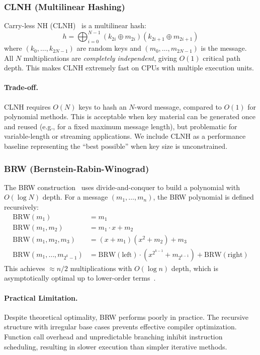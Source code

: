 \subsubsection{CLNH (Multilinear Hashing)}

Carry-less NH (CLNH)~\cite{lemire2015clhash} is a multilinear hash:
\[
h = \bigoplus_{i=0}^{N-1} (k_{2i} \oplus m_{2i})(k_{2i+1} \oplus m_{2i+1})
\]
where $(k_0, \ldots, k_{2N-1})$ are random keys and $(m_0, \ldots, m_{2N-1})$ is the message.
All $N$ multiplications are \emph{completely independent}, giving $O(1)$ critical path depth.
This makes CLNH extremely fast on CPUs with multiple execution units.

\paragraph{Trade-off.}
CLNH requires $O(N)$ keys to hash an $N$-word message, compared to $O(1)$ for polynomial methods.
This is acceptable when key material can be generated once and reused (e.g., for a fixed
maximum message length), but problematic for variable-length or streaming applications.
We include CLNH as a performance baseline representing the ``best possible'' when key size
is unconstrained.

\subsubsection{BRW (Bernstein-Rabin-Winograd)}

The BRW construction~\cite{rabin1972number} uses divide-and-conquer to build a polynomial
with $O(\log N)$ depth.
For a message $(m_1, \ldots, m_n)$, the BRW polynomial is defined recursively:
\begin{align}
\text{BRW}(m_1) &= m_1 \\
\text{BRW}(m_1, m_2) &= m_1 \cdot x + m_2 \\
\text{BRW}(m_1, m_2, m_3) &= (x + m_1)(x^2 + m_2) + m_3 \\
\text{BRW}(m_1, \ldots, m_{2^k-1}) &= \text{BRW}(\text{left}) \cdot (x^{2^{k-1}} + m_{2^{k-1}}) + \text{BRW}(\text{right})
\end{align}
This achieves $\approx n/2$ multiplications with $O(\log n)$ depth, which is asymptotically optimal up to lower-order terms~\cite{rabin1972number}.

\paragraph{Practical Limitation.}
Despite theoretical optimality, BRW performs poorly in practice.
The recursive structure with irregular base cases prevents effective compiler optimization.
Function call overhead and unpredictable branching inhibit instruction scheduling,
resulting in slower execution than simpler iterative methods.

